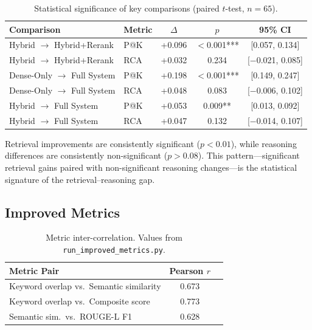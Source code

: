 \documentclass[11pt,a4paper]{article}
\begin{document}
\begin{table}[h]
\centering
\small
\caption{Statistical significance of key comparisons (paired $t$-test, $n{=}65$).}
\label{tab:significance}
\begin{tabular}{llccc}
\toprule
\textbf{Comparison} & \textbf{Metric} & \textbf{$\Delta$} & \textbf{$p$} & \textbf{95\% CI} \\
\midrule
Hybrid $\to$ Hybrid+Rerank & P@K & +0.096 & $<$0.001*** & [0.057, 0.134] \\
Hybrid $\to$ Hybrid+Rerank & RCA & +0.032 & 0.234 & [$-$0.021, 0.085] \\
\addlinespace
Dense-Only $\to$ Full System & P@K & +0.198 & $<$0.001*** & [0.149, 0.247] \\
Dense-Only $\to$ Full System & RCA & +0.048 & 0.083 & [$-$0.006, 0.102] \\
\addlinespace
Hybrid $\to$ Full System & P@K & +0.053 & 0.009** & [0.013, 0.092] \\
Hybrid $\to$ Full System & RCA & +0.047 & 0.132 & [$-$0.014, 0.107] \\
\bottomrule
\end{tabular}
\end{table}

Retrieval improvements are consistently significant ($p{<}0.01$),
while reasoning differences are consistently non-significant
($p{>}0.08$).
This pattern---significant retrieval gains paired with
non-significant reasoning changes---is the statistical signature of
the retrieval--reasoning gap.

\subsection{Improved Metrics}
\label{sec:metrics-result}

\begin{table}[h]
\centering
\small
\caption{Metric inter-correlation.
Values from \texttt{run\_improved\_metrics.py}.}
\label{tab:metric-corr}
\begin{tabular}{lcc}
\toprule
\textbf{Metric Pair} & \textbf{Pearson $r$} \\
\midrule
Keyword overlap vs.\ Semantic similarity      & 0.673 \\
Keyword overlap vs.\ Composite score          & 0.773 \\
Semantic sim.\ vs.\ ROUGE-L F1                & 0.628 \\
\bottomrule
\end{tabular}
\end{table}
\end{document}
